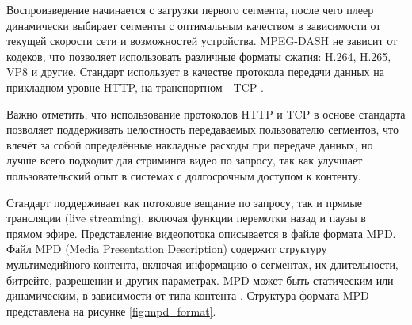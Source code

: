 	Воспроизведение начинается с загрузки первого сегмента, после чего плеер динамически выбирает сегменты с оптимальным качеством в зависимости от текущей скорости сети и возможностей устройства. MPEG-DASH не зависит от кодеков, что позволяет использовать различные форматы сжатия: H.264, H.265, VP8 и другие. Стандарт использует в качестве протокола передачи данных на прикладном уровне HTTP, на транспортном - TCP \cite{sodagarMpegDash}.
	
	Важно отметить, что использование протоколов HTTP и TCP в основе стандарта позволяет поддерживать целостность передаваемых пользователю сегментов, что влечёт за собой определённые накладные расходы при передаче данных, но лучше всего подходит для стриминга видео по запросу, так как улучшает пользовательский опыт в системах с долгосрочным доступом к контенту.
	
	Стандарт поддерживает как потоковое вещание по запросу, так и прямые трансляции (live streaming), включая функции перемотки назад и паузы в прямом эфире. Представление видеопотока описывается в файле формата MPD. Файл MPD (Media Presentation Description) содержит структуру мультимедийного контента, включая информацию о сегментах, их длительности, битрейте, разрешении и других параметрах. MPD может быть статическим или динамическим, в зависимости от типа контента \cite{sodagarMpegDash}. Структура формата MPD представлена на рисунке \ref{fig:mpd_format}.
	
